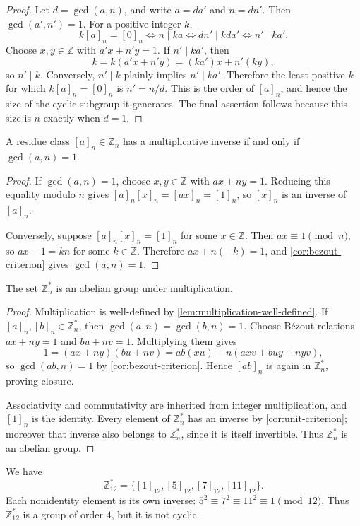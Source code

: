 \begin{proof}
	Let \(d=\gcd(a,n)\), and write \(a=da'\) and \(n=dn'\). Then
	\(\gcd(a',n')=1\). For a positive integer \(k\),
	\[
		k[a]_n=[0]_n
		\iff n\mid ka
		\iff dn'\mid kda'
		\iff n'\mid ka'.
	\]
	Choose \(x,y\in\mathbb Z\) with \(a'x+n'y=1\). If \(n'\mid ka'\), then
	\[
		k=k(a'x+n'y)=(ka')x+n'(ky),
	\]
	so \(n'\mid k\). Conversely, \(n'\mid k\) plainly implies \(n'\mid ka'\).
	Therefore the least positive \(k\) for which \(k[a]_n=[0]_n\) is
	\(n'=n/d\). This is the order of \([a]_n\), and hence the size of the cyclic
	subgroup it generates. The final assertion follows because this size is \(n\) exactly
	when \(d=1\).
\end{proof}

\begin{corollary}\label{cor:unit-criterion}
	A residue class \([a]_n\in\mathbb Z_n\) has a multiplicative inverse if and only if
	\(\gcd(a,n)=1\).
\end{corollary}

\begin{proof}
	If \(\gcd(a,n)=1\), choose \(x,y\in\mathbb Z\) with \(ax+ny=1\). Reducing this
	equality modulo \(n\) gives
	\([a]_n[x]_n=[ax]_n=[1]_n\), so \([x]_n\) is an inverse of \([a]_n\).

	Conversely, suppose \([a]_n[x]_n=[1]_n\) for some \(x\in\mathbb Z\). Then
	\(ax\equiv1\pmod n\), so \(ax-1=kn\) for some \(k\in\mathbb Z\). Therefore
	\(ax+n(-k)=1\), and \autoref{cor:bezout-criterion} gives \(\gcd(a,n)=1\).
\end{proof}

\begin{theorem}\label{thm:units-group}
	The set \(\mathbb Z_n^*\) is an abelian group under multiplication.
\end{theorem}

\begin{proof}
	Multiplication is well-defined by \autoref{lem:multiplication-well-defined}. If
	\([a]_n,[b]_n\in\mathbb Z_n^*\), then \(\gcd(a,n)=\gcd(b,n)=1\). Choose B\'ezout
	relations \(ax+ny=1\) and \(bu+nv=1\). Multiplying them gives
	\[
		1=(ax+ny)(bu+nv)=ab(xu)+n(axv+buy+nyv),
	\]
	so \(\gcd(ab,n)=1\) by \autoref{cor:bezout-criterion}. Hence \([ab]_n\) is again in
	\(\mathbb Z_n^*\), proving closure.

	Associativity and commutativity are inherited from integer multiplication, and
	\([1]_n\) is the identity. Every element of \(\mathbb Z_n^*\) has an inverse by
	\autoref{cor:unit-criterion}; moreover that inverse also belongs to \(\mathbb Z_n^*\),
	since it is itself invertible. Thus \(\mathbb Z_n^*\) is an abelian group.
\end{proof}

\begin{eg}
	We have
	\[
		\mathbb Z_{12}^*=\{[1]_{12},[5]_{12},[7]_{12},[11]_{12}\}.
	\]
	Each nonidentity element is its own inverse:
	\(5^2\equiv7^2\equiv11^2\equiv1\pmod{12}\). Thus
	\(\mathbb Z_{12}^*\) is a group of order \(4\), but it is not cyclic.
\end{eg}